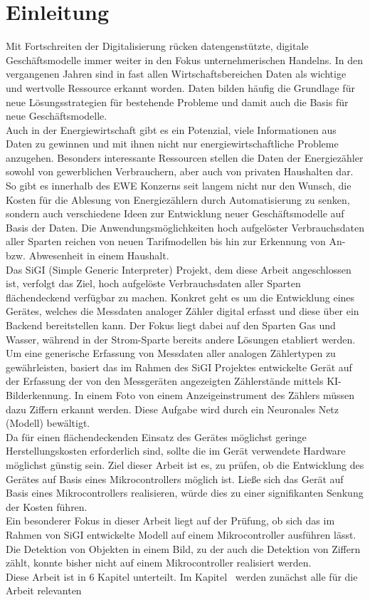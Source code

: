 \chapter{Einleitung}\label{ch:Einleitung}
    Mit Fortschreiten der Digitalisierung rücken datengenstützte, digitale Geschäftsmodelle immer weiter in den Fokus unternehmerischen Handelns. In den vergangenen Jahren sind in fast allen Wirtschaftsbereichen Daten als wichtige und wertvolle Ressource erkannt worden. Daten bilden häufig die Grundlage für neue Lösungsstrategien für bestehende Probleme und damit auch die Basis für neue Geschäftsmodelle.\\ Auch in der Energiewirtschaft gibt es ein Potenzial, viele Informationen aus Daten zu gewinnen und mit ihnen nicht nur energiewirtschaftliche Probleme anzugehen. Besonders interessante Ressourcen stellen die Daten der Energiezähler sowohl von gewerblichen Verbrauchern, aber auch von privaten Haushalten dar. So gibt es innerhalb des EWE Konzerns seit langem nicht nur den Wunsch, die Kosten für die Ablesung von Energiezählern durch Automatisierung zu senken, sondern auch verschiedene Ideen zur Entwicklung neuer Geschäftsmodelle auf Basis der Daten. Die Anwendungsmöglichkeiten hoch aufgelöster Verbrauchsdaten aller Sparten reichen von neuen Tarifmodellen bis hin zur Erkennung von An- bzw. Abwesenheit in einem Haushalt.\\ Das SiGI (Simple Generic Interpreter) Projekt, dem diese Arbeit angeschlossen ist, verfolgt das Ziel, hoch aufgelöste Verbrauchsdaten aller Sparten flächendeckend verfügbar zu machen. Konkret geht es um die Entwicklung eines Gerätes, welches die Messdaten analoger Zähler digital erfasst und diese über ein Backend bereitstellen kann. Der Fokus liegt dabei auf den Sparten Gas und Wasser, während in der Strom-Sparte bereits andere Lösungen etabliert werden.\\ Um eine generische Erfassung von Messdaten aller analogen Zählertypen zu gewährleisten, basiert das im Rahmen des SiGI Projektes entwickelte Gerät auf der Erfassung der von den Messgeräten angezeigten Zählerstände mittels KI-Bilderkennung. In einem Foto von einem Anzeigeinstrument des Zählers müssen dazu Ziffern erkannt werden. Diese Aufgabe wird durch ein Neuronales Netz (Modell) bewältigt.\\ Da für einen flächendeckenden Einsatz des Gerätes möglichst geringe Herstellungskosten erforderlich sind, sollte die im Gerät verwendete Hardware möglichst günstig sein. Ziel dieser Arbeit ist es, zu prüfen, ob die Entwicklung des Gerätes auf Basis eines Mikrocontrollers möglich ist. Ließe sich das Gerät auf Basis eines Mikrocontrollers realisieren, würde dies zu einer signifikanten Senkung der Kosten führen.\\ Ein besonderer Fokus in dieser Arbeit liegt auf der Prüfung, ob sich das im Rahmen von SiGI entwickelte Modell auf einem Mikrocontroller ausführen lässt. Die Detektion von Objekten in einem Bild, zu der auch die Detektion von Ziffern zählt, konnte bisher nicht auf einem Mikrocontroller realisiert werden.\\ Diese Arbeit ist in 6 Kapitel unterteilt. Im Kapitel~ werden zunächst alle für die Arbeit relevanten 